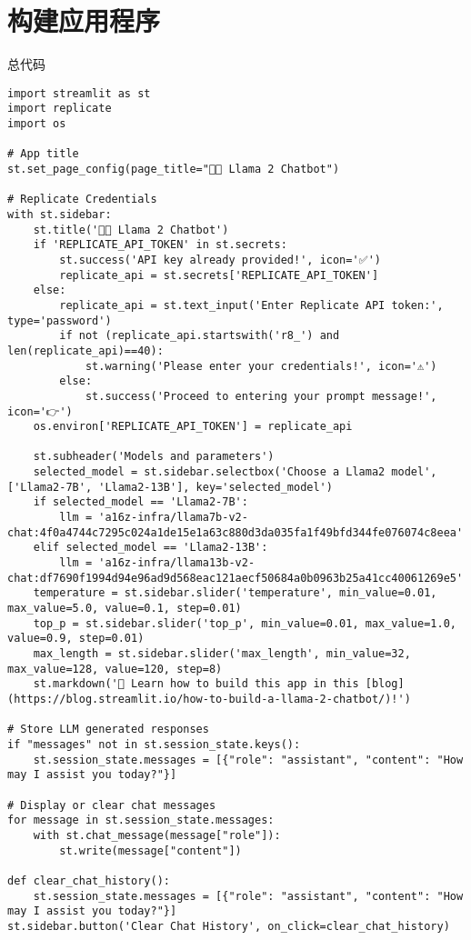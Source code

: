 \documentclass{article}
\begin{document}
\section{构建应用程序} 
总代码
\begin{lstlisting}
import streamlit as st
import replicate
import os

# App title
st.set_page_config(page_title="🦙💬 Llama 2 Chatbot")

# Replicate Credentials
with st.sidebar:
    st.title('🦙💬 Llama 2 Chatbot')
    if 'REPLICATE_API_TOKEN' in st.secrets:
        st.success('API key already provided!', icon='✅')
        replicate_api = st.secrets['REPLICATE_API_TOKEN']
    else:
        replicate_api = st.text_input('Enter Replicate API token:', type='password')
        if not (replicate_api.startswith('r8_') and len(replicate_api)==40):
            st.warning('Please enter your credentials!', icon='⚠️')
        else:
            st.success('Proceed to entering your prompt message!', icon='👉')
    os.environ['REPLICATE_API_TOKEN'] = replicate_api

    st.subheader('Models and parameters')
    selected_model = st.sidebar.selectbox('Choose a Llama2 model', ['Llama2-7B', 'Llama2-13B'], key='selected_model')
    if selected_model == 'Llama2-7B':
        llm = 'a16z-infra/llama7b-v2-chat:4f0a4744c7295c024a1de15e1a63c880d3da035fa1f49bfd344fe076074c8eea'
    elif selected_model == 'Llama2-13B':
        llm = 'a16z-infra/llama13b-v2-chat:df7690f1994d94e96ad9d568eac121aecf50684a0b0963b25a41cc40061269e5'
    temperature = st.sidebar.slider('temperature', min_value=0.01, max_value=5.0, value=0.1, step=0.01)
    top_p = st.sidebar.slider('top_p', min_value=0.01, max_value=1.0, value=0.9, step=0.01)
    max_length = st.sidebar.slider('max_length', min_value=32, max_value=128, value=120, step=8)
    st.markdown('📖 Learn how to build this app in this [blog](https://blog.streamlit.io/how-to-build-a-llama-2-chatbot/)!')

# Store LLM generated responses
if "messages" not in st.session_state.keys():
    st.session_state.messages = [{"role": "assistant", "content": "How may I assist you today?"}]

# Display or clear chat messages
for message in st.session_state.messages:
    with st.chat_message(message["role"]):
        st.write(message["content"])

def clear_chat_history():
    st.session_state.messages = [{"role": "assistant", "content": "How may I assist you today?"}]
st.sidebar.button('Clear Chat History', on_click=clear_chat_history)


\end{lstlisting}
\end{document}
